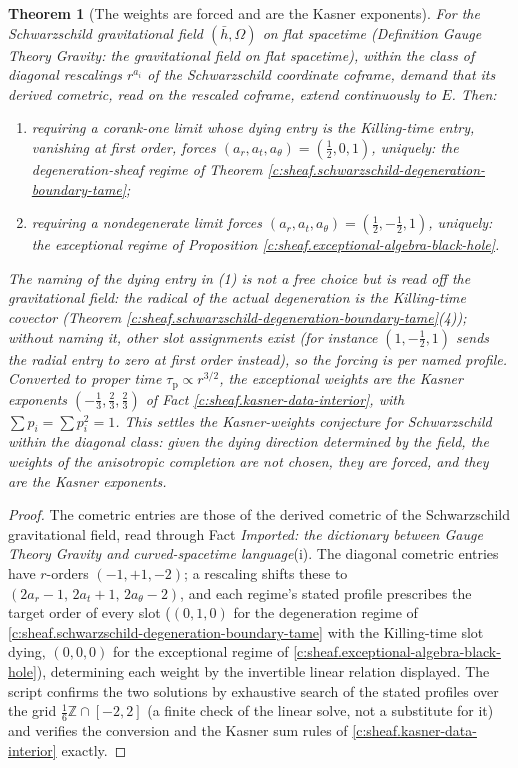 \documentclass[11pt]{article}
\newtheorem{theorem}{Theorem}[section]
\theoremstyle{definition}
\theoremstyle{plain}
\newcommand{\changedmark}[2]{\marginpar{\raggedright\scriptsize\color{#1}#2}}
\providecommand{\hb}{}\renewcommand{\hb}{\bar{h}}
\begin{document}
\begin{theorem}[The weights are forced and are the Kasner exponents]\label{c:sheaf.weights-are-forced-are-kasner-exponents}
\changedmark{gray}{reworded}
For the Schwarzschild gravitational field $(\hb, \Omega)$ on flat spacetime (Definition \emph{Gauge Theory Gravity: the gravitational field on flat spacetime}), within the class of diagonal rescalings $r^{a_i}$ of the Schwarzschild coordinate coframe, demand that its derived cometric, read on the rescaled coframe, extend continuously to $E$. Then:
\begin{enumerate}
\item requiring a corank-one limit whose dying entry is the Killing-time entry, vanishing at first order, forces $(a_r, a_t, a_\theta) = (\tfrac12, 0, 1)$, uniquely: the degeneration-sheaf regime of Theorem \ref{c:sheaf.schwarzschild-degeneration-boundary-tame};
\item requiring a nondegenerate limit forces $(a_r, a_t, a_\theta) = (\tfrac12, -\tfrac12, 1)$, uniquely: the exceptional regime of Proposition \ref{c:sheaf.exceptional-algebra-black-hole}.
\end{enumerate}
The naming of the dying entry in (1) is not a free choice but is read off the gravitational field: the radical of the actual degeneration is the Killing-time covector (Theorem \ref{c:sheaf.schwarzschild-degeneration-boundary-tame}(4)); without naming it, other slot assignments exist (for instance $(1, -\tfrac12, 1)$ sends the radial entry to zero at first order instead), so the forcing is per named profile. Converted to proper time $\tau_{\mathrm{p}} \propto r^{3/2}$, the exceptional weights are the Kasner exponents $(-\tfrac13, \tfrac23, \tfrac23)$ of Fact \ref{c:sheaf.kasner-data-interior}, with $\sum p_i = \sum p_i^2 = 1$. This settles the Kasner-weights conjecture for Schwarzschild within the diagonal class: given the dying direction determined by the field, the weights of the anisotropic completion are not chosen, they are forced, and they are the Kasner exponents.
\end{theorem}
\begin{proof}
The cometric entries are those of the derived cometric of the Schwarzschild gravitational field, read through Fact \emph{Imported: the dictionary between Gauge Theory Gravity and curved-spacetime language}(i). The diagonal cometric entries have $r$-orders $(-1, +1, -2)$; a rescaling shifts these to $(2a_r - 1,\, 2a_t + 1,\, 2a_\theta - 2)$, and each regime's stated profile prescribes the target order of every slot ($(0, 1, 0)$ for the degeneration regime of \ref{c:sheaf.schwarzschild-degeneration-boundary-tame} with the Killing-time slot dying, $(0,0,0)$ for the exceptional regime of \ref{c:sheaf.exceptional-algebra-black-hole}), determining each weight by the invertible linear relation displayed. The script confirms the two solutions by exhaustive search of the stated profiles over the grid $\tfrac16\mathbb{Z} \cap [-2,2]$ (a finite check of the linear solve, not a substitute for it) and verifies the conversion and the Kasner sum rules of \ref{c:sheaf.kasner-data-interior} exactly.

\end{proof}
\end{document}

